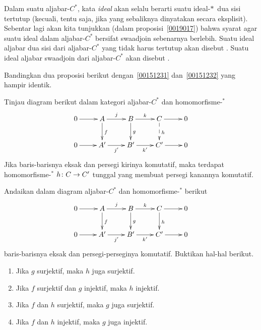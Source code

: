\begin{conv}\label{00151212} Dalam suatu aljabar-$C^*$, kata \emph{ideal} akan selalu
berarti suatu \hbox{ideal-$*\,$} dua sisi tertutup (kecuali, tentu saja, jika yang
sebaliknya dinyatakan secara eksplisit). Sebentar lagi akan kita tunjukkan (dalam
proposisi~\ref{0019017}) bahwa syarat agar suatu ideal dalam aljabar-$C^*$ bersifat
swaadjoin sebenarnya berlebih. Suatu ideal aljabar dua sisi dari aljabar-$C^*$ yang tidak
harus tertutup akan disebut
. Suatu ideal aljabar swaadjoin dari aljabar-$C^*$ akan disebut
.
\end{conv}

Bandingkan dua proposisi berikut dengan~\ref{00151231} dan~\ref{00151232} yang hampir identik.

\begin{prop}\label{00151231c} Tinjau diagram berikut dalam kategori aljabar-$C^*$ dan
homomorfisme-${}^*$
 \[\xymatrix{
      0\ar[r] & A\ar[d]^f\ar[r]^j & B\ar[d]^g\ar[r]^k
              & C\ar@{-->}[d]^h \ar[r] & 0 \\
      0\ar[r] & A'\ar[r]_{j'} & B'\ar[r]_{k'}
      & C'\ar[r] & 0
 }\]
Jika baris-barisnya eksak dan persegi kirinya komutatif, maka terdapat homomorfisme-${}^*$
$h\colon C \rightarrow C'$ tunggal yang membuat persegi kanannya komutatif.
\end{prop}

\begin{prop}\label{00151232c}
Andaikan dalam diagram aljabar-$C^*$ dan homomorfisme-${}^*$ berikut
 \[\xymatrix{
      0\ar[r] & A\ar[d]^f\ar[r]^j & B\ar[d]^g\ar[r]^k
              & C\ar[d]^h \ar[r] & 0 \\
      0\ar[r] & A'\ar[r]_{j'} & B'\ar[r]_{k'}
      & C'\ar[r] & 0
 }\]
baris-barisnya eksak dan persegi-perseginya komutatif. Buktikan hal-hal berikut.
 \begin{enumerate}
  \item Jika $g$ surjektif, maka $h$ juga surjektif.
  \item Jika $f$ surjektif dan $g$ injektif, maka $h$ injektif.
  \item Jika $f$ dan $h$ surjektif, maka $g$ juga surjektif.
  \item Jika $f$ dan $h$ injektif, maka $g$ juga injektif.
 \end{enumerate}
\end{prop}

